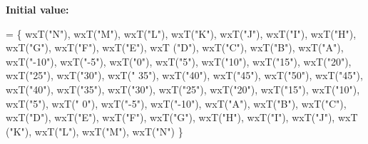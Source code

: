 {\bfseries Initial value\-:}
\begin{DoxyCode}
=
\{
    wxT(\textcolor{stringliteral}{"N"}), wxT(\textcolor{stringliteral}{"M"}), wxT(\textcolor{stringliteral}{"L"}), wxT(\textcolor{stringliteral}{"K"}), wxT(\textcolor{stringliteral}{"J"}), wxT(\textcolor{stringliteral}{"I"}), wxT(\textcolor{stringliteral}{"H"}), wxT(\textcolor{stringliteral}{"G"}), wxT(\textcolor{stringliteral}{"F"}), wxT(\textcolor{stringliteral}{"E"}), wxT
      (\textcolor{stringliteral}{"D"}), wxT(\textcolor{stringliteral}{"C"}), wxT(\textcolor{stringliteral}{"B"}), wxT(\textcolor{stringliteral}{"A"}),
    wxT(\textcolor{stringliteral}{"-10"}), wxT(\textcolor{stringliteral}{"-5"}), wxT(\textcolor{stringliteral}{"0"}), wxT(\textcolor{stringliteral}{"5"}), wxT(\textcolor{stringliteral}{"10"}), wxT(\textcolor{stringliteral}{"15"}), wxT(\textcolor{stringliteral}{"20"}), wxT(\textcolor{stringliteral}{"25"}), wxT(\textcolor{stringliteral}{"30"}), wxT(\textcolor{stringliteral}{"
      35"}), wxT(\textcolor{stringliteral}{"40"}), wxT(\textcolor{stringliteral}{"45"}), wxT(\textcolor{stringliteral}{"50"}),
    wxT(\textcolor{stringliteral}{"45"}), wxT(\textcolor{stringliteral}{"40"}), wxT(\textcolor{stringliteral}{"35"}), wxT(\textcolor{stringliteral}{"30"}), wxT(\textcolor{stringliteral}{"25"}), wxT(\textcolor{stringliteral}{"20"}), wxT(\textcolor{stringliteral}{"15"}), wxT(\textcolor{stringliteral}{"10"}), wxT(\textcolor{stringliteral}{"5"}), wxT(\textcolor{stringliteral}{"
      0"}), wxT(\textcolor{stringliteral}{"-5"}), wxT(\textcolor{stringliteral}{"-10"}),
    wxT(\textcolor{stringliteral}{"A"}), wxT(\textcolor{stringliteral}{"B"}), wxT(\textcolor{stringliteral}{"C"}), wxT(\textcolor{stringliteral}{"D"}), wxT(\textcolor{stringliteral}{"E"}), wxT(\textcolor{stringliteral}{"F"}), wxT(\textcolor{stringliteral}{"G"}), wxT(\textcolor{stringliteral}{"H"}), wxT(\textcolor{stringliteral}{"I"}), wxT(\textcolor{stringliteral}{"J"}), wxT
      (\textcolor{stringliteral}{"K"}), wxT(\textcolor{stringliteral}{"L"}), wxT(\textcolor{stringliteral}{"M"}), wxT(\textcolor{stringliteral}{"N"})
\}
\end{DoxyCode}
